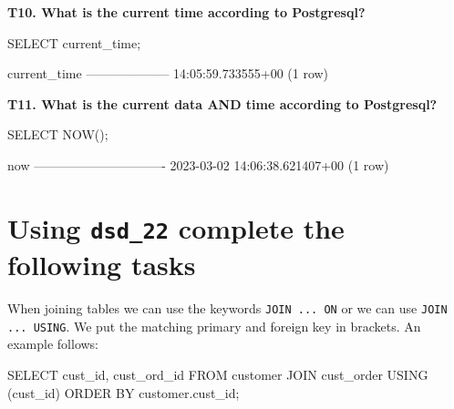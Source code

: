 \textbf{T10. What is the current time according to Postgresql?}
\begin{sql}
SELECT current_time;
\end{sql}
\begin{pseudo}
    current_time
--------------------
 14:05:59.733555+00
(1 row)
\end{pseudo}

\textbf{T11. What is the current data AND time according to Postgresql?}
\begin{sql}
SELECT NOW();
\end{sql}
\begin{pseudo}
              now
-------------------------------
 2023-03-02 14:06:38.621407+00
(1 row)
\end{pseudo}

\section*{Using \texttt{dsd\_22} complete the following tasks}
When joining tables we can use the keywords \texttt{JOIN ... ON} or we can use \texttt{JOIN ... USING}. We put the matching primary and foreign key in brackets. An example follows:
\begin{sql}
SELECT cust_id,
   	cust_ord_id
FROM customer
JOIN cust_order USING (cust_id)
ORDER BY customer.cust_id;
\end{sql}

